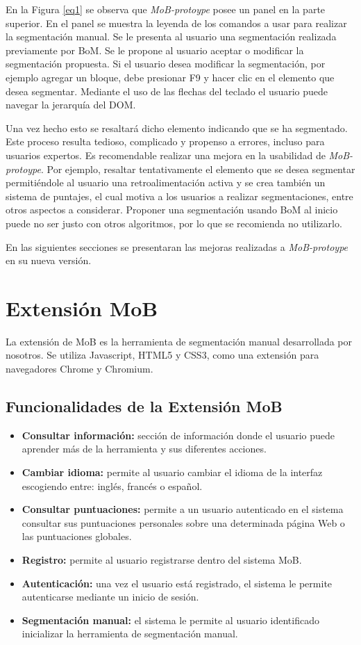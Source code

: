 \documentclass[10pt]{revecom}
\begin{document}
En la Figura \ref{eq1} se observa que \emph{MoB-protoype} posee un panel en la parte superior.
En el panel se muestra la leyenda de los comandos a usar para realizar la segmentación manual. 
Se le presenta al usuario una segmentación realizada previamente por BoM. 
Se le propone al usuario aceptar o modificar la segmentación propuesta. 
Si el usuario desea modificar la segmentación, por ejemplo agregar un bloque, debe presionar F9 y hacer clic en el elemento que desea segmentar. 
Mediante el uso de las flechas del teclado el usuario puede navegar la jerarquía del DOM.

Una vez hecho esto se resaltará dicho elemento indicando que se ha segmentado.
Este proceso resulta tedioso, complicado y propenso a errores, incluso para usuarios expertos. 
Es recomendable realizar una mejora en la usabilidad de \emph{MoB-protoype}. 
Por ejemplo, resaltar tentativamente el elemento que se desea segmentar permitiéndole al usuario una retroalimentación activa y se crea también un sistema de puntajes, el cual motiva a los usuarios a realizar segmentaciones, entre otros aspectos a considerar.
Proponer una segmentación usando BoM al inicio puede no ser justo con otros algoritmos, por lo que se recomienda no utilizarlo.

En las siguientes secciones se presentaran las mejoras realizadas a \emph{MoB-protoype} en su nueva versión.

\section{Extensión MoB}
\label{segmentacion_manual}
La extensión de MoB es la herramienta de segmentación manual desarrollada por nosotros. Se utiliza Javascript, HTML5 y CSS3, como una extensión para navegadores Chrome y Chromium.

\subsection{Funcionalidades de la Extensión MoB}
\begin{itemize}
\item \textbf{Consultar información:} sección de información donde el usuario puede aprender más de la herramienta y sus diferentes acciones.
\item \textbf{Cambiar idioma:} permite al usuario cambiar el idioma de la interfaz escogiendo entre: inglés, francés o español. 
\item \textbf{Consultar puntuaciones:} permite a un usuario autenticado en el sistema consultar sus puntuaciones personales sobre una determinada página Web o las puntuaciones globales. 
\item \textbf{Registro:} permite al usuario registrarse dentro del sistema MoB.
\item \textbf{Autenticación:} una vez el usuario está registrado, el sistema le permite autenticarse mediante un inicio de sesión. 
\item \textbf{Segmentación manual:} el sistema le permite al usuario identificado inicializar la herramienta de segmentación manual.
\end{itemize}
\end{document}

